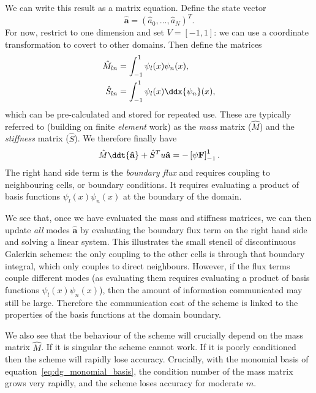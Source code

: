 We can write this result as a matrix equation. Define the state vector
%
\begin{equation}
  \label{eq:dg_state_vector}
  \mathbf{\hat{a}} = (\hat{a}_0, \dots, \hat{a}_N)^T.
\end{equation}
%
For now, restrict to one dimension and set $V = [-1, 1]$: we can use a
coordinate transformation to covert to other domains. Then define the matrices
%
\begin{align}
  \label{eq:dg_mass_matrix}
  \hat{M}_{ln} &= \int_{-1}^1 \psi_l(x) \psi_n(x), \\
  \label{eq:dg_stiffness_matrix}
  \hat{S}_{ln} &= \int_{-1}^1 \psi_l(x) \ddx{\psi_n}(x),
\end{align}
%
which can be pre-calculated and stored for repeated use. These are typically
referred to (building on finite \emph{element} work) as the \emph{mass} matrix
($\hat{M}$) and the \emph{stiffness} matrix ($\hat{S}$). We therefore finally
have
%
\begin{equation}
  \label{eq:dg_advection5}
  \hat{M} \ddt{\mathbf{\hat{a}}} + \hat{S}^T u \mathbf{\hat{a}} = -\left[ \mathbf{\psi F} \right]_{-1}^1.
\end{equation}
%
The right hand side term is the \emph{boundary flux} and requires coupling to
neighbouring cells, or boundary conditions. It requires evaluating a product of
basis functions $\psi_l(x) \psi_n(x)$ at the boundary of the domain.

We see that, once we have evaluated the mass and stiffness matrices, we can then
update \emph{all} modes $\mathbf{\hat{a}}$ by evaluating the boundary flux term
on the right hand side and solving a linear system. This illustrates the small
stencil of discontinuous Galerkin schemes: the only coupling to the other cells
is through that boundary integral, which only couples to direct neighbours.
However, if the flux terms couple different modes (as evaluating them requires
evaluating a product of basis functions $\psi_l(x) \psi_n(x)$), then the amount
of information communicated may still be large. Therefore the communication cost
of the scheme is linked to the properties of the basis functions at the domain
boundary.

We also see that the behaviour of the scheme will crucially depend on the mass
matrix $\hat{M}$. If it is singular the scheme cannot work. If it is poorly
conditioned then the scheme will rapidly lose accuracy. Crucially, with the
monomial basis of equation~\ref{eq:dg_monomial_basis}, the condition number of
the mass matrix grows very rapidly, and the scheme loses accuracy for moderate
$m$.

